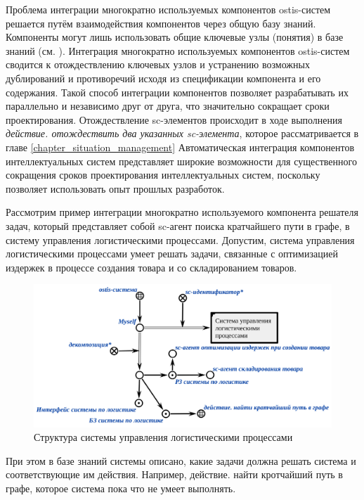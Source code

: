 Проблема интеграции многократно используемых компонентов ostis-систем решается путём взаимодействия компонентов через общую базу знаний. Компоненты могут лишь использовать общие ключевые узлы (понятия) в базе знаний (см. ). Интеграция многократно используемых компонентов ostis-систем сводится к отождествлению ключевых узлов и устранению возможных дублирований и противоречий исходя из спецификации компонента и его содержания. Такой способ интеграции компонентов позволяет разрабатывать их параллельно и независимо друг от друга, что значительно сокращает сроки проектирования. Отождествление sc-элементов происходит в ходе выполнения \textit{действие. отождествить два указанных sc-элемента}, которое рассматривается в главе \ref{chapter_situation_management} Автоматическая интеграция компонентов интеллектуальных систем представляет широкие возможности для существенного сокращения сроков проектирования интеллектуальных систем, поскольку позволяет использовать опыт прошлых разработок.

Рассмотрим пример интеграции многократно используемого компонента решателя задач, который представляет собой sc-агент поиска кратчайшего пути в графе, в систему управления логистическими процессами. Допустим, система управления логистическими процессами умеет решать задачи, связанные с оптимизацией издержек в процессе создания товара и со складированием товаров. 

\begin{figure}[H]
	\includegraphics[scale=0.5]{author/part5/figures/logistics_system.png}
	\caption{Структура системы управления логистическими процессами}
	\label{fig:logistics_system}
\end{figure}

При этом в базе знаний системы описано, какие задачи должна решать система и соответствующие им действия. Например, действие. найти кротчайший путь в графе, которое система пока что не умеет выполнять.

